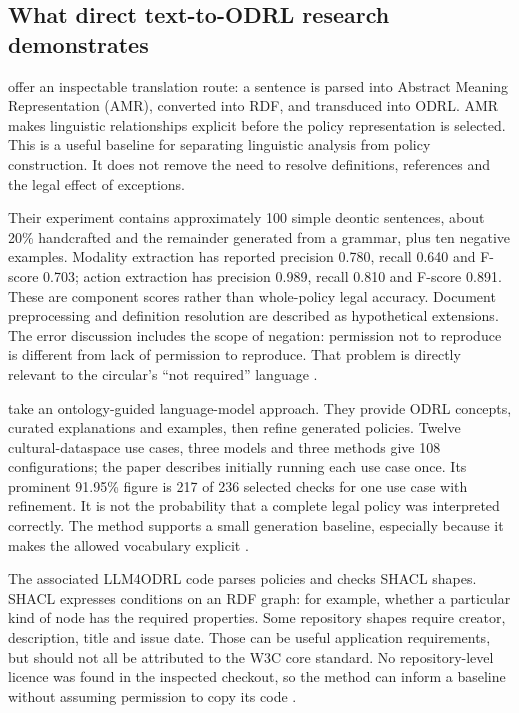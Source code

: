 \subsection{What direct text-to-ODRL research demonstrates}

\citet{revelodrl2023} offer an inspectable translation route: a sentence is
parsed into Abstract Meaning Representation (AMR), converted into RDF, and
transduced into ODRL. AMR makes linguistic relationships explicit before
the policy representation is selected. This is a useful baseline for separating
linguistic analysis from policy construction. It does not remove the need to
resolve definitions, references and the legal effect of exceptions.

Their experiment contains approximately 100 simple deontic sentences, about
20\% handcrafted and the remainder generated from a grammar, plus ten
negative examples. Modality extraction has reported precision 0.780, recall
0.640 and F-score 0.703; action extraction has precision 0.989, recall 0.810
and F-score 0.891. These are component scores rather than whole-policy legal
accuracy. Document preprocessing and definition resolution are described as
hypothetical extensions. The error discussion includes the scope of negation:
permission not to reproduce is different from lack of permission to reproduce.
That problem is directly relevant to the circular's ``not required'' language
\citep[method, experiments and error discussion]{revelodrl2023}.

\citet{mustafaodrl2024} take an ontology-guided language-model approach. They
provide ODRL concepts, curated explanations and examples, then refine generated
policies. Twelve cultural-dataspace use cases, three models and three methods
give 108 configurations; the paper describes initially running each use case
once. Its prominent 91.95\% figure is 217 of 236 selected checks for one use
case with refinement. It is not the probability that a complete legal policy
was interpreted correctly. The method supports a small generation baseline,
especially because it makes the allowed vocabulary explicit
\citep[secs.~2--4 and Table~1]{mustafaodrl2024}.

The associated LLM4ODRL code parses policies and checks SHACL shapes. SHACL
expresses conditions on an RDF graph: for example, whether a particular kind
of node has the required properties. Some repository shapes require creator,
description, title and issue date. Those can be useful application requirements,
but should not all be attributed to the W3C core standard. No repository-level
licence was found in the inspected checkout, so the method can inform a baseline
without assuming permission to copy its code \citep{hkmaodrlsoftware2026}.

